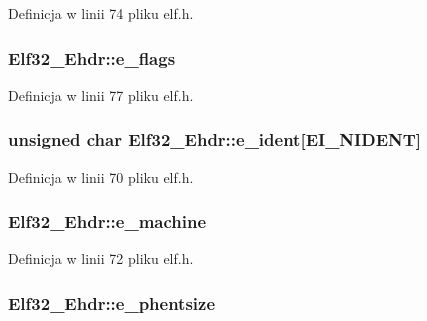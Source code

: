 Definicja w linii 74 pliku elf.\-h.

\hypertarget{struct_elf32___ehdr_a87cf481be7917fafde0c4ecf78c8e574}{
\subsubsection[{e\-\_\-flags}]{ Elf32\-\_\-\-Ehdr\-::e\-\_\-flags}}\label{struct_elf32___ehdr_a87cf481be7917fafde0c4ecf78c8e574}


Definicja w linii 77 pliku elf.\-h.

\hypertarget{struct_elf32___ehdr_aba47ac5e0af02d5668782f1fd5a7466c}{
\subsubsection[{e\-\_\-ident}]{\setlength{\rightskip}{0pt plus 5cm}unsigned char Elf32\-\_\-\-Ehdr\-::e\-\_\-ident\mbox{[}{\bf E\-I\-\_\-\-N\-I\-D\-E\-N\-T}\mbox{]}}}\label{struct_elf32___ehdr_aba47ac5e0af02d5668782f1fd5a7466c}


Definicja w linii 70 pliku elf.\-h.

\hypertarget{struct_elf32___ehdr_a19bca7faba9e5573814643efc3574c7b}{
\subsubsection[{e\-\_\-machine}]{ Elf32\-\_\-\-Ehdr\-::e\-\_\-machine}}\label{struct_elf32___ehdr_a19bca7faba9e5573814643efc3574c7b}


Definicja w linii 72 pliku elf.\-h.

\hypertarget{struct_elf32___ehdr_afa2289f96d86fcc568a3b1f40cc8953e}{
\subsubsection[{e\-\_\-phentsize}]{ Elf32\-\_\-\-Ehdr\-::e\-\_\-phentsize}}\label{struct_elf32___ehdr_afa2289f96d86fcc568a3b1f40cc8953e}


